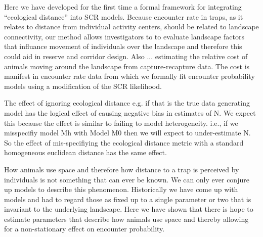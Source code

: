 Here we have developed for the first time a formal framework for integrating
``ecological distance'' into SCR models. Because encounter rate in traps, as it relates
to distance from individual activity centers, should be related to landscape 
connectivity, our method allows investigators to 
to evaluate landscape factors that influance movement of individuals over the
landscape and therefore this could aid in reserve and corridor design.
Also ...
estimating the relative cost of animals moving around the landscape 
from capture-recapture data. The cost is manifest in encounter rate 
data from which we formally fit encounter probability models using a 
modification of the SCR likelihood.

The effect of ignoring ecological distance e.g. if that is the true
data generating model has the logical effect of causing negative bias in
estimates of N. We expect this because the effect is similar to failing
to model heterogeneity. i.e., if we misspecifiy model Mh with Model M0 then
we will expect to under-estimate N. So the effect of mis-specifiying the
ecological distance metric with a standard homogeneous euclidean distance
has the same effect.  

How animals use space and therefore how distance to a trap is perceived
by individuals is not something that can ever be known. We can only ever
conjure up models to describe this phenomenon. Historically we have
come up with models and had to regard those as fixed up to a single parameter
or two that is invariant to the underlying landscape. Here we have shown
that there is hope to estimate parameters that describe how animals use
space and thereby allowing for a non-stationary effect on encounter probability.















